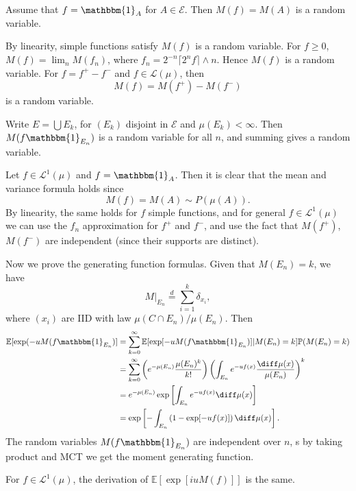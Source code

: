 \documentclass[12pt]{article}
\begin{document}
\begin{proofbox}
	Assume that $f = \mathbbm{1}_{A}$ for $A \in \mathcal{E}$. Then $M(f) = M(A)$ is a random variable.

	By linearity, simple functions satisfy $M(f)$ is a random variable. For $f \geq 0$, $M(f) = \lim_n M(f_n)$, where $f_n = 2^{-n} \lceil 2^{n} f \rceil \wedge n$. Hence $M(f)$ is a random variable. For $f = f^{+} - f^{-}$ and $f \in \mathcal{L}(\mu)$, then
	\[
	M(f) = M(f^{+}) - M(f^{-})
	\]
	is a random variable.

	Write $E = \bigcup E_k$, for $(E_k)$ disjoint in $\mathcal{E}$ and $\mu(E_k) < \infty$. Then $M(f \mathbbm{1}_{E_n})$ is a random variable for all $n$, and summing gives a random variable.

	Let $f \in \mathcal{L}^1(\mu)$ and $f = \mathbbm{1}_{A}$. Then it is clear that the mean and variance formula holds since
	\[
	M(f) = M(A) \sim P(\mu(A)).
	\]
	By linearity, the same holds for $f$ simple functions, and for general $f \in \mathcal{L}^1(\mu)$ we can use the $f_n$ approximation for $f^+$ and $f^-$, and use the fact that $M(f^+)$, $M(f^{-})$ are independent (since their supports are distinct).

	Now we prove the generating function formulas. Given that $M(E_n) = k$, we have
	\[
	M|_{E_n} \overset d = \sum_{i = 1}^k \delta_{x_i},
	\]
	where $(x_i)$ are IID with law $\mu(C \cap E_n) / \mu(E_n)$. Then
	\begin{align*}
		\mathbb{E}[\exp(-u M(f \mathbbm{1}_{E_n})] &= \sum_{k = 0}^\infty \mathbb{E}[\exp[-u M(f \mathbbm{1}_{E_n})] | M(E_n) = k] \mathbb{P}(M(E_n) = k) \\
							   &= \sum_{k = 0}^\infty \left( e^{-\mu(E_n)} \frac{\mu(E_n)^k}{k!} \right) \left( \int_{E_n} e^{-uf(x)} \frac{\diff \mu(x)}{\mu(E_n)} \right)^{k} \\
							   &= e^{-\mu(E_n)} \exp \left[ \int_{E_n} e^{-u f(x)} \diff \mu(x) \right] \\
							   &= \exp \left[ - \int_{E_n}  \left( 1 - \exp[-uf(x)] \right) \diff \mu(x)\right].
	\end{align*}
	The random variables $M(f \mathbbm{1}_{E_n})$ are independent over $n$, s by taking product and MCT we get the moment generating function.

	For $f \in \mathcal{L}^1(\mu)$, the derivation of $\mathbb{E}[\exp[i u M(f)]]$ is the same.
\end{proofbox}



\newpage

\printindex
\end{document}
